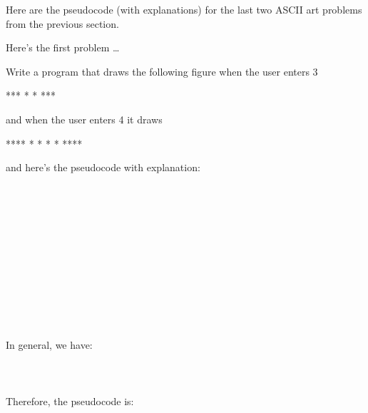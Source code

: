 \begin{console}
\newpage{}

Here are the pseudocode (with explanations) for the last two ASCII art problems from the previous section.

Here's the first problem \ldots

\begin{ex}
Write a program that draws the following figure when the user enters 3
\begin{console}
***
* *
***
\end{console}
and when the user enters 4 it draws
\begin{console}
****
*  *
*  *
****
\end{console}
and here's the pseudocode with explanation:

\\
    \\
    \\
    \\
    \\    
\\      
\\
    \\
    \\
    \\
    \\

In general, we have:\\
\\
\\
\\

Therefore, the pseudocode is:

\\
\\
\\
\\
\\
\\
\\
\\


\end{ex}
\end{console}

